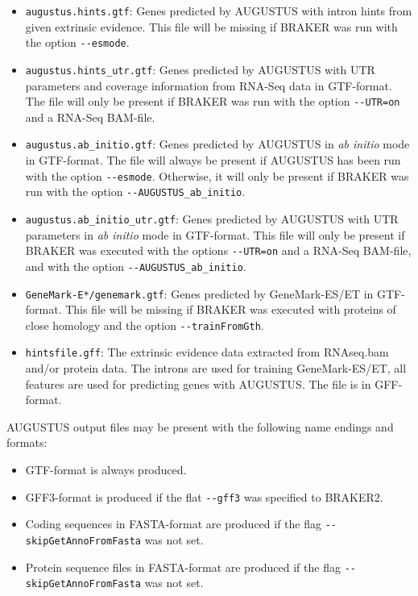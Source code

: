 \documentclass[]{article}
\begin{document}
\begin{itemize}
\item
  \texttt{augustus.hints.gtf}: Genes predicted by AUGUSTUS with intron hints from given extrinsic
  evidence. This file will be missing if BRAKER was run with the option
  \texttt{-\/-esmode}.
\item
  \texttt{augustus.hints\_utr.gtf}: Genes predicted by AUGUSTUS with UTR parameters and coverage
  information from RNA-Seq data in GTF-format. The file will only be
  present if BRAKER was run with the option \texttt{-\/-UTR=on} and a
  RNA-Seq BAM-file.
\item
  \texttt{augustus.ab\_initio.gtf}: Genes predicted by AUGUSTUS in \emph{ab initio} mode in GTF-format.
  The file will always be present if AUGUSTUS has been run with the
  option \texttt{-\/-esmode}. Otherwise, it will only be present if
  BRAKER was run with the option \texttt{-\/-AUGUSTUS\_ab\_initio}.
\item
  \texttt{augustus.ab\_initio\_utr.gtf}: Genes predicted by AUGUSTUS with UTR parameters in \emph{ab initio}
  mode in GTF-format. This file will only be present if BRAKER was
  executed with the options \texttt{-\/-UTR=on} and a RNA-Seq BAM-file,
  and with the option \texttt{-\/-AUGUSTUS\_ab\_initio}.
\item
  \texttt{GeneMark-E*/genemark.gtf}: Genes predicted by GeneMark-ES/ET in GTF-format. This file will be
  missing if BRAKER was executed with proteins of close homology and the
  option \texttt{-\/-trainFromGth}.
\item
  \texttt{hintsfile.gff}: The extrinsic evidence data extracted from RNAseq.bam and/or protein
  data. The introns are used for training GeneMark-ES/ET, all features
  are used for predicting genes with AUGUSTUS. The file is in
  GFF-format.
\end{itemize}

AUGUSTUS output files may be present with the following name endings and
formats:

\begin{itemize}
\item
  GTF-format is always produced.
\item
  GFF3-format is produced if the flat \texttt{-\/-gff3} was specified to
  BRAKER2.
\item
  Coding sequences in FASTA-format are produced if the flag
  \texttt{-\/-skipGetAnnoFromFasta} was not set.
\item
  Protein sequence files in FASTA-format are produced if the flag
  \texttt{-\/-skipGetAnnoFromFasta} was not set.
\end{itemize}
\end{document}
